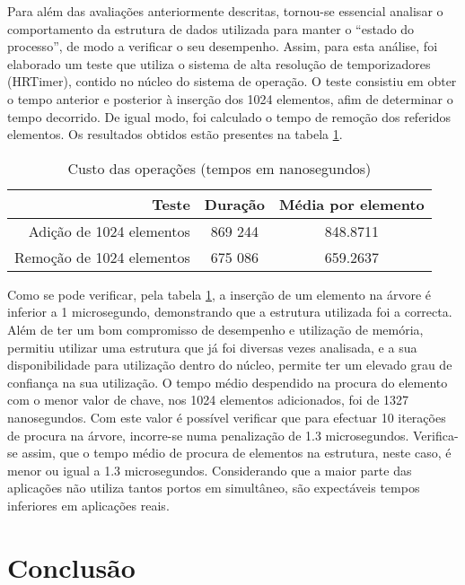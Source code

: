 Para além das avaliações anteriormente descritas, tornou-se essencial analisar o comportamento da estrutura de dados utilizada para manter o “estado do processo”, de modo a verificar o seu desempenho.
Assim, para esta análise, foi elaborado um teste que utiliza o sistema de alta resolução de temporizadores (HRTimer), contido no núcleo do sistema de operação. O teste consistiu em obter o tempo anterior e posterior à inserção dos 1024 elementos, afim de determinar o tempo decorrido.
De igual modo, foi calculado o tempo de remoção dos referidos elementos. Os resultados obtidos estão presentes na tabela \ref{tab:tree_info}.

\begin{table}[!htb]
\begin{center}
\caption{Custo das operações (tempos em nanosegundos)}
\begin{tabular}{ | r | c | c | }
\hline
\hspace{1cm} Teste \hspace{1.5cm} & \hspace{1cm}Duração\hspace{1cm} &  Média por
elemento \\
\hline
Adição de 1024 elementos & 869 244 & 848.8711 \\
\hline
Remoção de 1024 elementos & 675 086 & 659.2637\\
\hline

\hline
\end{tabular}
\label{tab:tree_info}
\end{center}
\end{table}

Como se pode verificar, pela tabela \ref{tab:tree_info}, a inserção de um elemento na árvore é inferior a 1 microsegundo, demonstrando que a estrutura utilizada foi a correcta.
Além de ter um bom compromisso de desempenho e utilização de memória, permitiu utilizar uma estrutura que já foi diversas vezes analisada, e a sua disponibilidade para utilização dentro do núcleo, permite ter um elevado grau de confiança na sua utilização.
O tempo médio despendido na procura do elemento com o menor valor de chave, nos 1024 elementos adicionados, foi de 1327 nanosegundos.
Com este valor é possível verificar que para efectuar 10 iterações de procura na árvore, incorre-se numa penalização de 1.3 microsegundos.
Verifica-se assim, que o tempo médio de procura de elementos na estrutura, neste caso, é menor ou igual a 1.3 microsegundos.
Considerando que a maior parte das aplicações não utiliza tantos portos em simultâneo, são expectáveis tempos inferiores em aplicações reais.

\section{Conclusão}

